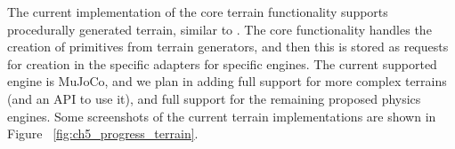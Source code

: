 The current implementation of the core terrain functionality supports procedurally generated
terrain, similar to \cite{DeepmindEmergenceLocomotion}. The core functionality handles 
the creation of primitives from terrain generators, and then this is stored as 
requests for creation in the specific adapters for specific engines. The current 
supported engine is MuJoCo, and we plan in adding full support for more complex 
terrains (and an API to use it), and full support for the remaining proposed physics 
engines. Some screenshots of the current terrain implementations are shown
in Figure ~\ref{fig:ch5_progress_terrain}.

\figProgressTerrains

